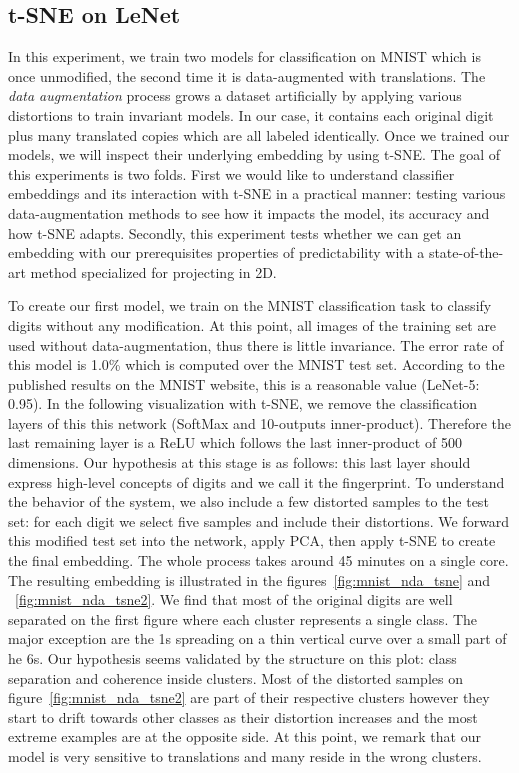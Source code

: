 \documentclass[a4paper,12pt]{report}
\begin{document}

\subsection{t-SNE on LeNet}

In this experiment, we train two models for classification on MNIST which is once unmodified, the second time it is data-augmented with translations.
The {\em data augmentation} process grows a dataset artificially by applying various distortions to train invariant models.
In our case, it contains each original digit plus many translated copies which are all labeled identically.
Once we trained our models, we will inspect their underlying embedding by using t-SNE.
The goal of this experiments is two folds.
First we would like to understand classifier embeddings and its interaction with t-SNE in a practical manner: testing various data-augmentation methods to see how it impacts the model, its accuracy and how t-SNE adapts.
Secondly, this experiment tests whether we can get an embedding with our prerequisites properties of predictability with a state-of-the-art method specialized for projecting in 2D.

To create our first model, we train on the MNIST classification task to classify digits without any modification.
At this point, all images of the training set are used without data-augmentation, thus there is little invariance.
The error rate of this model is 1.0\% which is computed over the MNIST test set.
According to the published results on the MNIST website, this is a reasonable value (LeNet-5: 0.95)\cite{mnist_web}.
In the following visualization with t-SNE, we remove the classification layers of this this network (SoftMax and 10-outputs inner-product).
Therefore the last remaining layer is a ReLU which follows the last inner-product of 500 dimensions.
Our hypothesis at this stage is as follows: this last layer should express high-level concepts of digits and we call it the fingerprint.
To understand the behavior of the system, we also include a few distorted samples to the test set: for each digit we select five samples and include their distortions.
We forward this modified test set into the network, apply PCA, then apply t-SNE to create the final embedding.
The whole process takes around 45 minutes on a single core.
The resulting embedding is illustrated in the figures~\ref{fig:mnist_nda_tsne} and ~\ref{fig:mnist_nda_tsne2}.
We find that most of the original digits are well separated on the first figure where each cluster represents a single class.
The major exception are the 1s spreading on a thin vertical curve over a small part of he 6s.
Our hypothesis seems validated by the structure on this plot: class separation and coherence inside clusters.
Most of the distorted samples on figure~\ref{fig:mnist_nda_tsne2} are part of their respective clusters however they start to drift towards other classes as their distortion increases and the most extreme examples are at the opposite side.
At this point, we remark that our model is very sensitive to translations and many reside in the wrong clusters.
\end{document}
